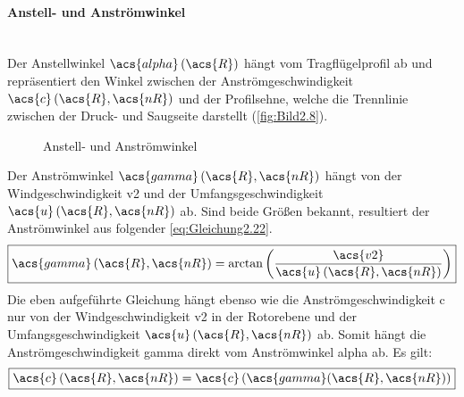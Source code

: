 \paragraph{Anstell- und Anströmwinkel}\mbox{}\smallskip\\
Der Anstellwinkel $\acs{alpha}\left(\acs{R}\right)$ hängt vom Tragflügelprofil ab und repräsentiert den Winkel zwischen der Anströmgeschwindigkeit $\acs{c}\left(\acs{R}, \acs{nR}\right)$ und der Profilsehne, welche die Trennlinie zwischen der Druck- und Saugseite darstellt (\autoref{fig:Bild2.8}).
\begin{figure}[H]
   \centering
   \caption[Anstell- und Anströmwinkel]{Anstell- und Anströmwinkel}
   \label{fig:Bild2.8}
\end{figure}

Der Anströmwinkel $\acs{gamma}\left(\acs{R}, \acs{nR}\right)$ hängt von der Windgeschwindigkeit \acs{v2} und der Umfangsgeschwindigkeit $\acs{u}\left(\acs{R}, \acs{nR}\right)$ ab. Sind beide Größen bekannt, resultiert der Anströmwinkel aus folgender \autoref{eq:Gleichung2.22}.
\begin{equation} \label{eq:Gleichung2.22}
	\boxed{\acs{gamma}\left(\acs{R}, \acs{nR}\right) = \arctan\left(\frac{\acs{v2}}{\acs{u}\left(\acs{R}, \acs{nR}\right)}\right)}
\end{equation}
\newline
Die eben aufgeführte Gleichung hängt ebenso wie die Anströmgeschwindigkeit \acs{c} nur von der Windgeschwindigkeit \acs{v2} in der Rotorebene und der Umfangsgeschwindigkeit $\acs{u}\left(\acs{R}, \acs{nR}\right)$ ab. Somit hängt die Anströmgeschwindigkeit \acs{gamma} direkt vom Anströmwinkel \acs{alpha} ab. Es gilt:
\begin{equation} \label{eq:Gleichung2.23}
	\boxed{\acs{c}\left(\acs{R}, \acs{nR}\right) = \acs{c}\left(\acs{gamma}(\acs{R}, \acs{nR})\right)}
\end{equation}

